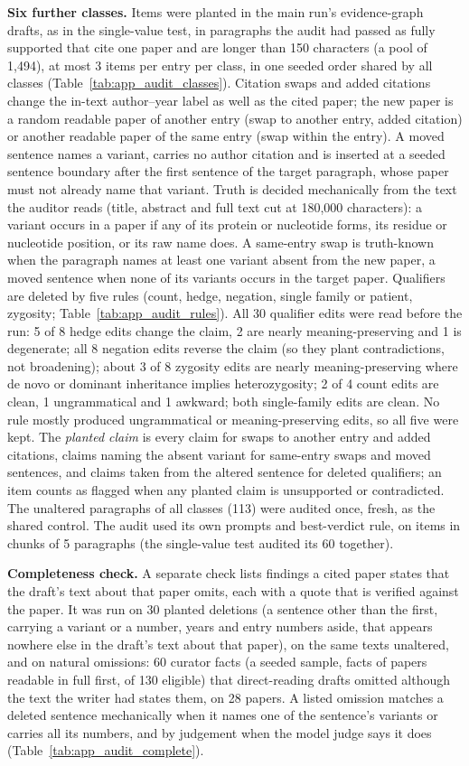 \documentclass{article} %
\begin{document}
\textbf{Six further classes.} Items were planted in the main run's evidence-graph drafts, as in the single-value test, in paragraphs the audit had passed as fully supported that cite one paper and are longer than 150 characters (a pool of 1,494), at most 3 items per entry per class, in one seeded order shared by all classes (Table~\ref{tab:app_audit_classes}). Citation swaps and added citations change the in-text author--year label as well as the cited paper; the new paper is a random readable paper of another entry (swap to another entry, added citation) or another readable paper of the same entry (swap within the entry). A moved sentence names a variant, carries no author citation and is inserted at a seeded sentence boundary after the first sentence of the target paragraph, whose paper must not already name that variant. Truth is decided mechanically from the text the auditor reads (title, abstract and full text cut at 180,000 characters): a variant occurs in a paper if any of its protein or nucleotide forms, its residue or nucleotide position, or its raw name does. A same-entry swap is truth-known when the paragraph names at least one variant absent from the new paper, a moved sentence when none of its variants occurs in the target paper. Qualifiers are deleted by five rules (count, hedge, negation, single family or patient, zygosity; Table~\ref{tab:app_audit_rules}). All 30 qualifier edits were read before the run: 5 of 8 hedge edits change the claim, 2 are nearly meaning-preserving and 1 is degenerate; all 8 negation edits reverse the claim (so they plant contradictions, not broadening); about 3 of 8 zygosity edits are nearly meaning-preserving where de novo or dominant inheritance implies heterozygosity; 2 of 4 count edits are clean, 1 ungrammatical and 1 awkward; both single-family edits are clean. No rule mostly produced ungrammatical or meaning-preserving edits, so all five were kept. The \emph{planted claim} is every claim for swaps to another entry and added citations, claims naming the absent variant for same-entry swaps and moved sentences, and claims taken from the altered sentence for deleted qualifiers; an item counts as flagged when any planted claim is unsupported or contradicted. The unaltered paragraphs of all classes (113) were audited once, fresh, as the shared control. The audit used its own prompts and best-verdict rule, on items in chunks of 5 paragraphs (the single-value test audited its 60 together).

\textbf{Completeness check.} A separate check lists findings a cited paper states that the draft's text about that paper omits, each with a quote that is verified against the paper. It was run on 30 planted deletions (a sentence other than the first, carrying a variant or a number, years and entry numbers aside, that appears nowhere else in the draft's text about that paper), on the same texts unaltered, and on natural omissions: 60 curator facts (a seeded sample, facts of papers readable in full first, of 130 eligible) that direct-reading drafts omitted although the text the writer had states them, on 28 papers. A listed omission matches a deleted sentence mechanically when it names one of the sentence's variants or carries all its numbers, and by judgement when the model judge says it does (Table~\ref{tab:app_audit_complete}).
\end{document}
